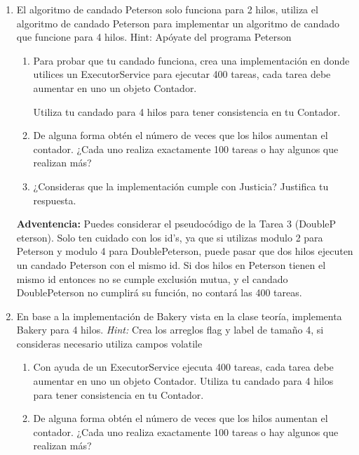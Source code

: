 \begin{enumerate}
    \item El algoritmo de candado Peterson solo funciona para 2 hilos, utiliza el algoritmo de candado Peterson para implementar un algoritmo de candado que funcione para 4 hilos. Hint: Apóyate del programa Peterson

    \begin{enumerate}
        \item Para probar que tu candado funciona, crea una implementación en donde utilices un ExecutorService para ejecutar 400 tareas, cada tarea debe aumentar en uno un objeto Contador.
        
        Utiliza tu candado para 4 hilos para tener consistencia en tu Contador.

        \item De alguna forma obtén el número de veces que los hilos aumentan el contador. ¿Cada uno realiza exactamente 100 tareas o hay algunos que realizan más?

        \item ¿Consideras que la implementación cumple con Justicia? Justifica tu respuesta.
    \end{enumerate}

    \textbf{Adventencia:} Puedes considerar el pseudocódigo de la Tarea 3 (DoubleP eterson). Solo ten cuidado con los id’s, ya que si utilizas modulo 2 para Peterson y modulo 4 para DoublePeterson, puede pasar que dos hilos ejecuten un candado Peterson con el mismo id. Si dos hilos en Peterson tienen el mismo id entonces no se cumple exclusión mutua, y el candado DoublePeterson no cumplirá su función, no contará las 400 tareas.

    \hfill

    \item  En base a la implementación de Bakery vista en la clase teoría, implementa Bakery para 4 hilos. \textit{Hint:} Crea los arreglos flag y label de tamaño 4, si consideras necesario utiliza campos volatile

    \begin{enumerate}
        \item Con ayuda de un ExecutorService ejecuta 400 tareas, cada tarea debe aumentar en uno un objeto Contador. Utiliza tu candado para 4 hilos para tener consistencia en tu Contador.

        \item De alguna forma obtén el número de veces que los hilos aumentan el contador. ¿Cada uno realiza exactamente 100 tareas o hay algunos que realizan más?


\end{enumerate}
\end{enumerate}
